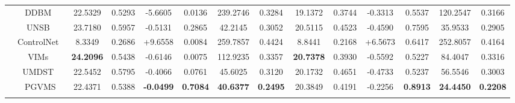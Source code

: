 \documentclass[journal,twoside,web]{ieeecolor}
\begin{document}
\begin{table}[ht]
{\begin{tabular}{c|c|cc|cc|cc|cc|cc|cc}
    &  DDBM~\cite{zhou2023denoising} & 22.5329 & 0.5293 & -5.6605 & 0.0136 & 239.2746 & 0.3284 & 19.1372 & 0.3744 & -0.3313 & 0.5537 & 120.2547 & 0.3166 \\
     & UNSB~\cite{kim2023unpaired} & 23.7180 & 0.5957 & -0.5131 & 0.2865 & 42.2145 & 0.3052 & 20.5115 & 0.4523 & -0.4590 & 0.7595 & 35.9533 & 0.2905 \\
        \Xhline{0.8pt}
      \rowcolor{gray!10}
     & ControlNet~\cite{zhang2023adding}  & 8.3349 & 0.2686 & +9.6558 & 0.0084 & 259.7857 & 0.4424 & 8.8441 & 0.2168 & +6.5673 & 0.6417 & 252.8057 & 0.4164 \\
     \rowcolor{gray!10}
    &  VIMs~\cite{dubey2024vims} & \textbf{24.2096} & 0.5438 & -0.6146 & 0.0075 & 112.9235 & 0.3357 & \textbf{20.7378} & 0.3930 & -0.5592 & 0.5227 & 84.4047 & 0.3316 \\
      \rowcolor{gray!10}
       &  UMDST~\cite{lin2022unpaired}&
    22.5452 & 0.5795 & -0.4066 & 0.0761 & 45.6025 & 0.3120 &
    20.1732 & 0.4651 & -0.4733 & 0.5237 & 56.5546 & 0.3003 \\
    
    \rowcolor{gray!10}




    \multirow{-4}{*}{One-to-many} & PGVMS & 22.4371 & 0.5388 & \textbf{-0.0499} & \textbf{0.7084} & \textbf{40.6377} & \textbf{0.2495} & 20.3849 & 0.4191 & -0.2256 & \textbf{0.8913} & \textbf{24.4450} & \textbf{0.2208} \\
      \Xhline{1.5pt} 
    \end{tabular}
  }
\end{table}

\end{document}
